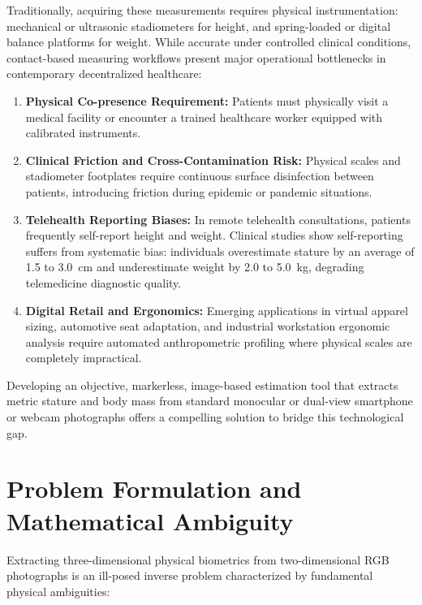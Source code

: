 \documentclass[12pt,a4paper,oneside]{report}
\begin{document}
Traditionally, acquiring these measurements requires physical instrumentation: mechanical or ultrasonic stadiometers for height, and spring-loaded or digital balance platforms for weight. While accurate under controlled clinical conditions, contact-based measuring workflows present major operational bottlenecks in contemporary decentralized healthcare:
\begin{enumerate}[label=\arabic*.]
    \item \textbf{Physical Co-presence Requirement:} Patients must physically visit a medical facility or encounter a trained healthcare worker equipped with calibrated instruments.
    \item \textbf{Clinical Friction and Cross-Contamination Risk:} Physical scales and stadiometer footplates require continuous surface disinfection between patients, introducing friction during epidemic or pandemic situations.
    \item \textbf{Telehealth Reporting Biases:} In remote telehealth consultations, patients frequently self-report height and weight. Clinical studies show self-reporting suffers from systematic bias: individuals overestimate stature by an average of 1.5 to 3.0~cm and underestimate weight by 2.0 to 5.0~kg, degrading telemedicine diagnostic quality.
    \item \textbf{Digital Retail and Ergonomics:} Emerging applications in virtual apparel sizing, automotive seat adaptation, and industrial workstation ergonomic analysis require automated anthropometric profiling where physical scales are completely impractical.
\end{enumerate}

Developing an objective, markerless, image-based estimation tool that extracts metric stature and body mass from standard monocular or dual-view smartphone or webcam photographs offers a compelling solution to bridge this technological gap.

\section{Problem Formulation and Mathematical Ambiguity}
Extracting three-dimensional physical biometrics from two-dimensional RGB photographs is an ill-posed inverse problem characterized by fundamental physical ambiguities:
\end{document}
